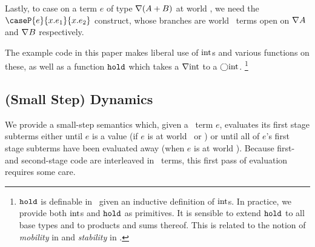 \begin{abstrsyn}
Lastly, to case on a term $e$ of type $\nabla(A+B)$ at world \bbonem, we need the
$\caseP{e}{x.e_1}{x.e_2}$ construct, whose branches are world \bbonem\ terms
open on $\nabla{A}$ and $\nabla{B}$ respectively.

The example code in this paper makes liberal use of ${\rm int}$s and various
functions on these, as well as a function ${\tt hold}$ which takes a $\nabla{\rm int}$
to a $\bigcirc{\rm int}$.%
\footnote{${\tt hold}$ is definable in \lang\ given an inductive definition of
${\rm int}$s. In practice, we provide both ${\rm int}$s and ${\tt hold}$ as primitives.
It is sensible to extend ${\tt hold}$ to all base types and to products and sums
thereof. This is related to the notion of {\em mobility} in \cite{murphy05} and
{\em stability} in \cite{krishnaswami13}.}

\end{abstrsyn}


\subsection{(Small Step) Dynamics}
\label{sec:dynamics}

We provide a small-step semantics which,
given a \lang\ term $e$, evaluates its first stage subterms
either until $e$ is a value (if $e$ is at world \bbonep\ or \bbonem)
or until all of $e$'s first stage subterms have been evaluated away
(when $e$ is at world \bbtwo).
Because first- and second-stage code are
interleaved in \lang\ terms, this first pass of
evaluation requires some care.

